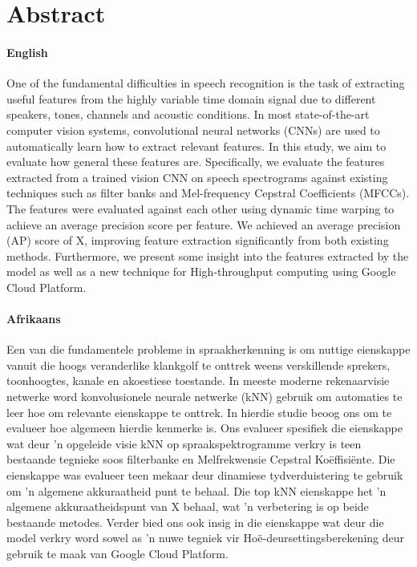 \chapter*{Abstract}
\makeatletter{}\makeatother

\subsubsection*{English}

One of the fundamental difficulties in speech recognition is the task of extracting useful features from the highly variable time domain signal due to different speakers, tones, channels and acoustic conditions.
In most state-of-the-art computer vision systems, convolutional neural networks (CNNs) are used to automatically learn how to extract relevant features.
In this study, we aim to evaluate how general these features are.
Specifically, we evaluate the features extracted from a trained vision CNN on speech spectrograms against existing techniques such as filter banks and Mel-frequency Cepstral Coefficients (MFCCs).
The features were evaluated against each other using dynamic time warping to achieve an average precision score per feature.
We achieved an average precision (AP) score of X, improving feature extraction significantly from both existing methods.
Furthermore, we present some insight into the features extracted by the model as well as a new technique for High-throughput computing using Google Cloud Platform.


\subsubsection*{Afrikaans}

Een van die fundamentele probleme in spraakherkenning is om nuttige eienskappe vanuit die hoogs veranderlike klankgolf te onttrek weens verskillende sprekers, toonhoogtes, kanale en akoestiese toestande.
In meeste moderne rekenaarvisie netwerke word konvolusionele neurale netwerke (kNN) gebruik om automaties te leer hoe om relevante eienskappe te onttrek.
In hierdie studie beoog ons om te evalueer hoe algemeen hierdie kenmerke is.
Ons evalueer spesifiek die eienskappe wat deur 'n opgeleide visie kNN op spraakspektrogramme verkry is teen bestaande tegnieke soos filterbanke en Melfrekwensie Cepstral Koëffisiënte.
Die eienskappe was evalueer teen mekaar deur dinamiese tydverduistering te gebruik om 'n algemene akkuraatheid punt te behaal.
Die top kNN eienskappe het 'n algemene akkuraatheidspunt van X behaal, wat 'n verbetering is op beide bestaande metodes.
Verder bied ons ook insig in die eienskappe wat deur die model verkry word sowel as 'n nuwe tegniek vir Hoë-deursettingsberekening deur gebruik te maak van Google Cloud Platform.

